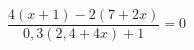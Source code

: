 \begin{ex}[type=equation]
	\begin{condition}
		$\dfrac{4(x+ 1) -2(7+2x)}{0,3(2,4+4x) + 1} = 0$
	\end{condition}
	\answer{$\varnothing$}
\end{ex}
